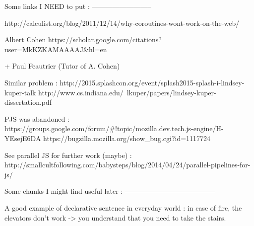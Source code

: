 Some links I NEED to put :
--------------------------

http://calculist.org/blog/2011/12/14/why-coroutines-wont-work-on-the-web/

Albert Cohen
https://scholar.google.com/citations?user=MkKZKAMAAAAJ&hl=en

+ Paul Feautrier (Tutor of A. Cohen)


Similar problem :
http://2015.splashcon.org/event/splash2015-splash-i-lindsey-kuper-talk
http://www.cs.indiana.edu/~lkuper/papers/lindsey-kuper-dissertation.pdf

PJS was abandoned :
https://groups.google.com/forum/#!topic/mozilla.dev.tech.js-engine/H-YEsejE6DA
https://bugzilla.mozilla.org/show_bug.cgi?id=1117724

See parallel JS for further work (maybe) :
http://smallcultfollowing.com/babysteps/blog/2014/04/24/parallel-pipelines-for-js/

Some chunks I might find useful later :
---------------------------------------

A good example of declarative sentence in everyday world : in case of fire, 
the elevators don't work -> you understand that you need to take the stairs.